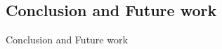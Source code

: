 \documentclass[draft,dvipsnames]{drexel-thesis}
\begin{document}
\begin{thesis}
\chapter{Conclusion and Future work}
Conclusion and Future work\\



\end{thesis}


\end{document}
